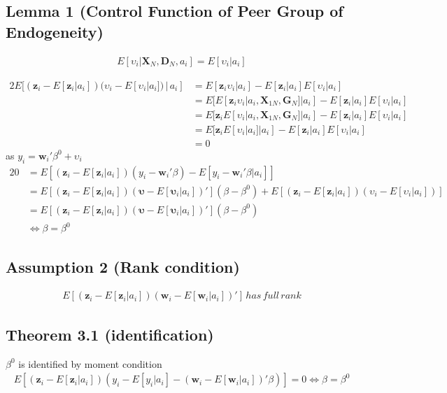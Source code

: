 \documentclass[11pt]{article}
\begin{document}
\subsection{Lemma 1 (Control Function of Peer Group of Endogeneity)} 
  \begin{align}
E[\upsilon_i | \mathbf{X}_N, \mathbf{D}_N, a_i] = E[\upsilon_i | a_i]
  \end{align}

\begin{alignat}{2}
E[(\mathbf{z}_i - E[\mathbf{z}_i|a_i]) (\upsilon_i - E[\upsilon_i | a_i]) \, | \, a_i] &= E[\mathbf{z}_i\upsilon_i | a_i] - E[\mathbf{z}_i|a_i]E[\upsilon_i | a_i]        \nonumber \\
 &= E[E[\mathbf{z}_i\upsilon_i | a_i,\mathbf{X}_{1N}, \mathbf{G}_{N}]|a_i] - E[\mathbf{z}_i|a_i]E[\upsilon_i | a_i]	\nonumber \\
 &= E[\mathbf{z}_iE[\upsilon_i | a_i,\mathbf{X}_{1N}, \mathbf{G}_{N}]|a_i] - E[\mathbf{z}_i|a_i]E[\upsilon_i | a_i]	\nonumber \\
 &= E[\mathbf{z}_iE[\upsilon_i | a_i]|a_i] - E[\mathbf{z}_i|a_i]E[\upsilon_i | a_i]	\nonumber \\
 & = 0 
\end{alignat}
as $y_i = \mathbf{w}_i'\beta^0 +\upsilon_i$
\begin{alignat}{2}
0 &= E[(\mathbf{z}_i - E[\mathbf{z}_i|a_i])(y_i - \mathbf{w}_i'\beta) - E[y_i - \mathbf{w}_i'\beta | a_i] ]        \nonumber \\
 &= E[(\mathbf{z}_i - E[\mathbf{z}_i|a_i])(\mathbf{\upsilon}-E[\mathbf{\upsilon}_i | a_i])'](\beta -\beta^0) + E[(\mathbf{z}_i - E[\mathbf{z}_i|a_i])(\upsilon_i - E[\upsilon_i | a_i])] \nonumber \\
 &= E[(\mathbf{z}_i - E[\mathbf{z}_i|a_i])(\mathbf{\upsilon}-E[\mathbf{\upsilon}_i | a_i])'](\beta -\beta^0)	\nonumber \\
 &\Leftrightarrow \beta = \beta^0
\end{alignat}


\subsection{Assumption 2 (Rank condition)} 
  \begin{align}
E[(\mathbf{z}_i - E[\mathbf{z}_i|a_i]) (\mathbf{w}_i - E[\mathbf{w}_i | a_i])'] \, has \, full \, rank
  \end{align}

\subsection{Theorem 3.1 (identification)}
$\beta^0$ is identified by moment condition 
\begin{align}
E[(\mathbf{z}_i - E[\mathbf{z}_i|a_i]) (y_i - E[y_i | a_i ] - (\mathbf{w}_i - E[\mathbf{w}_i | a_i])'\beta)] = 0 \Leftrightarrow \beta = \beta^0
\end{align}
\end{document}
